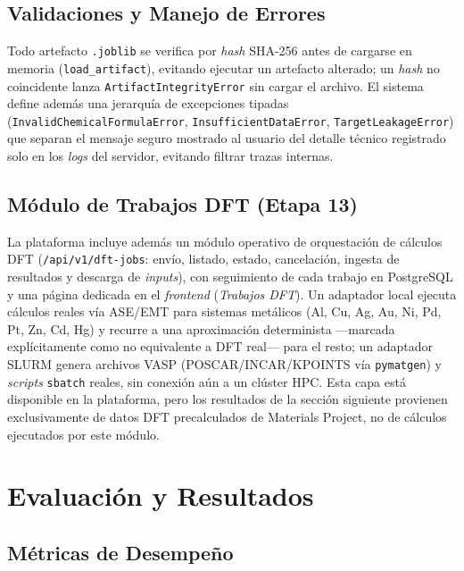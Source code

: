 \subsection{Validaciones y Manejo de Errores}

Todo artefacto \texttt{.joblib} se verifica por \textit{hash} SHA-256 antes
de cargarse en memoria (\texttt{load\_artifact}), evitando ejecutar un
artefacto alterado; un \textit{hash} no coincidente lanza
\texttt{ArtifactIntegrityError} sin cargar el archivo. El sistema define
además una jerarquía de excepciones tipadas (\texttt{InvalidChemicalFormu\-laError},
\texttt{InsufficientDataError}, \texttt{TargetLeakageError}) que separan el
mensaje seguro mostrado al usuario del detalle técnico registrado solo en
los \textit{logs} del servidor, evitando filtrar trazas internas.

\subsection{Módulo de Trabajos DFT (Etapa 13)}

La plataforma incluye además un módulo operativo de orquestación de cálculos
DFT (\texttt{/api/v1/dft-jobs}: envío, listado, estado, cancelación, ingesta
de resultados y descarga de \textit{inputs}), con seguimiento de cada
trabajo en PostgreSQL y una página dedicada en el \textit{frontend}
(\textit{Trabajos DFT}). Un adaptador local ejecuta cálculos reales vía
ASE/EMT para sistemas metálicos (Al, Cu, Ag, Au, Ni, Pd, Pt, Zn, Cd, Hg) y
recurre a una aproximación determinista —marcada explícitamente como no
equivalente a DFT real— para el resto; un adaptador SLURM genera archivos
VASP (POSCAR/INCAR/KPOINTS vía \texttt{pymatgen}) y \textit{scripts}
\texttt{sbatch} reales, sin conexión aún a un clúster HPC. Esta capa está
disponible en la plataforma, pero los resultados de la sección siguiente
provienen exclusivamente de datos DFT precalculados de Materials Project,
no de cálculos ejecutados por este módulo.

\section{Evaluación y Resultados}

\subsection{Métricas de Desempeño}

